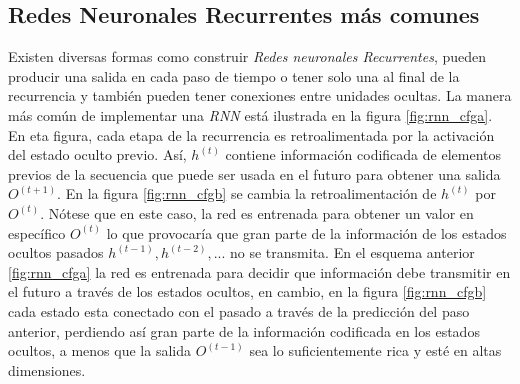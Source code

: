 \subsection{Redes Neuronales Recurrentes más comunes}

Existen diversas formas como construir \textit{Redes neuronales Recurrentes}, pueden producir una
salida en cada paso de tiempo o tener solo una al final de la recurrencia  y también pueden tener
conexiones entre unidades ocultas. La manera más común de implementar una \textit{RNN} está ilustrada en la
figura \ref{fig:rnn_cfga}. En eta figura, cada etapa de la recurrencia es retroalimentada por la
activación del estado oculto previo. Así, $h^{(t)}$ contiene información codificada de elementos
previos de la secuencia que puede ser usada en el futuro para obtener una salida $O^{(t+1)}$. En la
figura \ref{fig:rnn_cfgb} se
cambia la retroalimentación de $h^{(t)}$ por $O^{(t)}$. Nótese que en este caso, la red es entrenada
para obtener un valor en específico $O^{(t)}$ lo que provocaría que gran parte de la información de
los estados ocultos pasados $h^{(t-1)}, h^{(t-2)}, ...$ no se transmita. En el esquema anterior
\ref{fig:rnn_cfga} la red es entrenada para decidir que información debe transmitir en el futuro a través
de los estados ocultos, en cambio, en la figura \ref{fig:rnn_cfgb} cada estado esta conectado con el
pasado a través de la predicción del paso anterior, perdiendo así gran parte de la información
codificada en los estados ocultos, a menos que la salida $O^{(t-1)}$ sea lo suficientemente rica y
esté en altas dimensiones.


